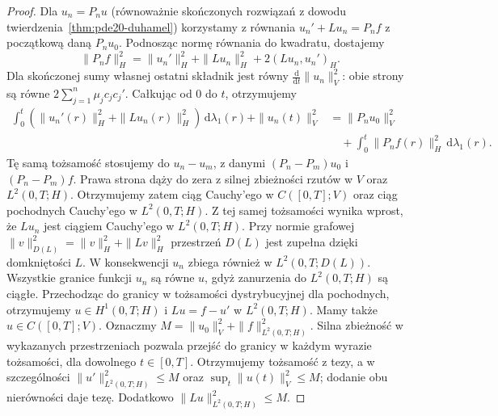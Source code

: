 \begin{proof}
Dla $u_n=P_nu$ (równoważnie skończonych rozwiązań
z dowodu twierdzenia~\ref{thm:pde20-duhamel})
korzystamy z równania $u_n'+Lu_n=P_nf$
z początkową daną $P_nu_0$.
Podnosząc normę równania do kwadratu, dostajemy
\[
 \|P_nf\|_H^2
 =\|u_n'\|_H^2+\|Lu_n\|_H^2+2(Lu_n,u_n')_H.
\]
Dla skończonej sumy własnej ostatni składnik jest
równy $\frac{\mathrm d}{\mathrm dt}\|u_n\|_V^2$:
obie strony są równe $2\sum_{j=1}^n\mu_jc_jc_j'$.
Całkując od $0$ do $t$, otrzymujemy
\[
 \begin{split}
 \int_0^t(\|u_n'(r)\|_H^2+\|Lu_n(r)\|_H^2)
 \,\mathrm d\lambda_1(r)+\|u_n(t)\|_V^2
 &=\|P_nu_0\|_V^2\\
 &\quad+\int_0^t\|P_nf(r)\|_H^2\,\mathrm d\lambda_1(r).
 \end{split}
\]
Tę samą tożsamość stosujemy do $u_n-u_m$, z danymi
$(P_n-P_m)u_0$ i $(P_n-P_m)f$. Prawa strona
dąży do zera z silnej zbieżności rzutów w $V$
oraz $L^2(0,T;H)$. Otrzymujemy zatem ciąg Cauchy'ego
w $C([0,T];V)$ oraz ciąg pochodnych Cauchy'ego
w $L^2(0,T;H)$. Z tej samej tożsamości wynika wprost, że
$Lu_n$ jest ciągiem Cauchy'ego w $L^2(0,T;H)$.
Przy normie grafowej
$\|v\|_{D(L)}^2=\|v\|_H^2+\|Lv\|_H^2$
przestrzeń $D(L)$ jest zupełna dzięki domkniętości $L$.
W konsekwencji $u_n$ zbiega również w
$L^2(0,T;D(L))$. Wszystkie granice funkcji $u_n$
są równe $u$, gdyż zanurzenia do $L^2(0,T;H)$
są ciągłe. Przechodząc do granicy w tożsamości
dystrybucyjnej dla pochodnych, otrzymujemy
$u\in H^1(0,T;H)$ i $Lu=f-u'$ w $L^2(0,T;H)$.
Mamy także $u\in C([0,T];V)$.
Oznaczmy $M=\|u_0\|_V^2+\|f\|_{L^2(0,T;H)}^2$.
Silna zbieżność w wykazanych przestrzeniach pozwala
przejść do granicy w każdym wyrazie tożsamości,
dla dowolnego $t\in[0,T]$. Otrzymujemy tożsamość
z tezy, a w szczególności
$\|u'\|_{L^2(0,T;H)}^2\le M$ oraz
$\sup_t\|u(t)\|_V^2\le M$; dodanie obu nierówności
daje tezę. Dodatkowo
$\|Lu\|_{L^2(0,T;H)}^2\le M$.
\end{proof}

